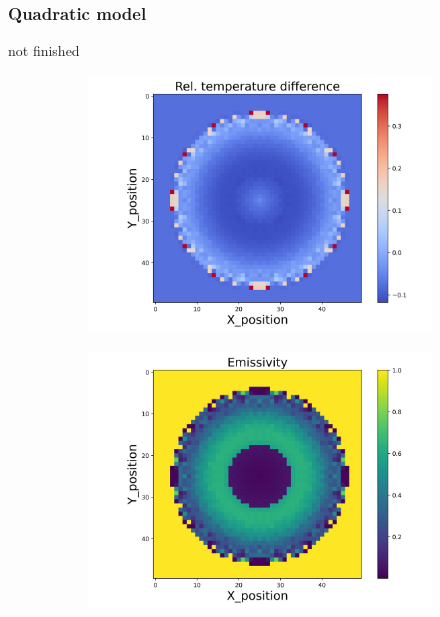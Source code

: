 \subsubsection{Quadratic model}
not finished
\begin{figure}[htbp]
    \centering
    \begin{minipage}{\textwidth}
        \centering
        \begin{subfigure}{0.49\textwidth}
            \centering
            \includegraphics[width=\textwidth]{figures/raw_data/31/mix/T_bias.jpg}
        \end{subfigure}
        \begin{subfigure}{0.49\textwidth}
            \centering
            \includegraphics[width=\textwidth]{figures/raw_data/31/mix/emi_cal.jpg}

\end{subfigure}
\end{minipage}
\end{figure}
